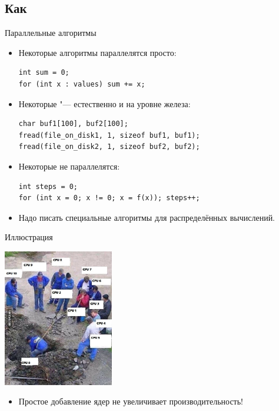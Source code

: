 \subsection{Как}
\begin{frame}[fragile]{Параллельные алгоритмы}
	\begin{itemize}
		\item Некоторые алгоритмы параллелятся просто:
\begin{verbatim}
int sum = 0;
for (int x : values) sum += x;
\end{verbatim}
		\item Некоторые "--- естественно и на уровне железа:
\begin{verbatim}
char buf1[100], buf2[100];
fread(file_on_disk1, 1, sizeof buf1, buf1);
fread(file_on_disk2, 1, sizeof buf2, buf2);
\end{verbatim}
		\item Некоторые не параллелятся:
\begin{verbatim}
int steps = 0;
for (int x = 0; x != 0; x = f(x)); steps++;
\end{verbatim}
		\item Надо писать специальные алгоритмы для распределённых вычислений.
	\end{itemize}
\end{frame}

\begin{frame}{Иллюстрация}
	\begin{center}
		\includegraphics[height=6cm]{cpus-joke.jpg}
	\end{center}
	\begin{itemize}
		\item Простое добавление ядер не увеличивает производительность!
	\end{itemize}
\end{frame}

